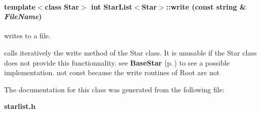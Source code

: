 \paragraph{\setlength{\rightskip}{0pt plus 5cm}template$<$class Star$>$ int Star\-List$<$Star$>$::write (const string \& {\em File\-Name})}\hfill\label{class_starlist_a2}


writes to a file.

calls iteratively the write method of the Star  class. It is unusable if the Star class does not  provide this functionnality. see {\bf Base\-Star} {\rm (p.\,\pageref{class_basestar})} to see a possible implementation.  not const because the write routines of Root are not 

The documentation for this class was generated from the following file:\begin{CompactItemize}
\item 
{\bf starlist.h}\end{CompactItemize}
